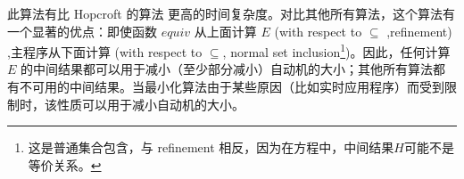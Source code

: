 此算法有比 Hopcroft 的算法 \cite{Hopc71,Grie73} 更高的时间复杂度。对比其他所有算法，这个算法有一个显著的优点：即使函数 $equiv$ 从上面计算 $E$ (with respect to $\subseteq$ ,refinement) ,主程序从下面计算 (with respect to $ \subseteq $, normal set inclusion\footnote{这是普通集合包含，与 refinement 相反，因为在方程中，中间结果$H$可能不是等价关系。})。因此，任何计算 $E$ 的中间结果都可以用于减小（至少部分减小）自动机的大小；其他所有算法都有不可用的中间结果。当最小化算法由于某些原因（比如实时应用程序）而受到限制时，该性质可以用于减小自动机的大小。
